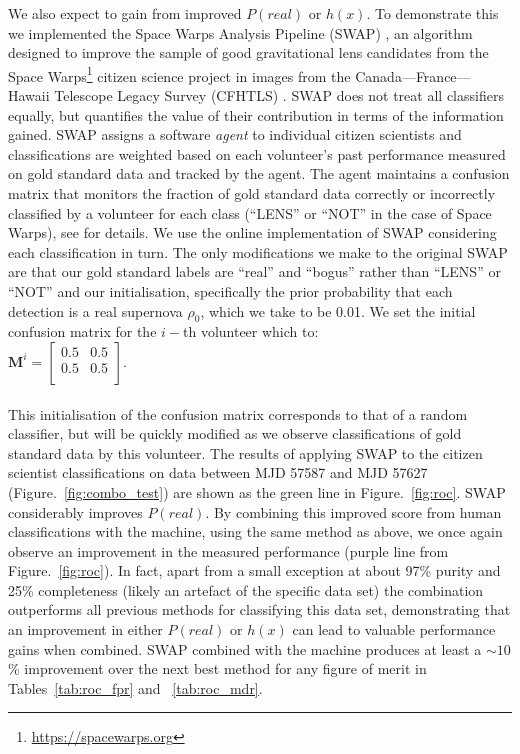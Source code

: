 \message{ !name(blank.tex)}\documentclass[a4paper,fleqn,usenatbib]{mnras}
\begin{document}
We also expect to gain from improved $P(real)$ or $h(x)$.  To demonstrate this we implemented the Space Warps Analysis Pipeline (SWAP) \citep{Marshall16}, an algorithm designed to improve the sample of good gravitational lens candidates from the Space Warps\footnote{\url{https://spacewarps.org}} citizen science project in images from the Canada--–France--–Hawaii Telescope Legacy Survey (CFHTLS) \citep{Gwyn12}.  SWAP does not treat all classifiers equally, but quantifies the value of their contribution in terms of the information gained.  SWAP assigns a software \emph{agent} to individual citizen scientists and classifications are weighted based on each volunteer's past performance measured on gold standard data and tracked by the agent.  The agent maintains a confusion matrix that monitors the fraction of gold standard data correctly or incorrectly classified by a volunteer for each class (``LENS'' or ``NOT'' in the case of Space Warps), see \citet{Marshall16} for details.   We use the online implementation of SWAP considering each classification in turn.  The only modifications we make to the original SWAP are that our gold standard labels are ``real'' and ``bogus'' rather than ``LENS'' or ``NOT'' and our initialisation, specifically the prior probability that each detection is a real supernova $\rho_0$, which we take to be 0.01.  We set the initial confusion matrix for the $i-$th volunteer which to:\\

 $\bm{M}^i = \begin{bmatrix}
                        0.5&0.5\\
                        0.5&0.5 \\
                        \end{bmatrix}$.\\
\\
This initialisation of the confusion matrix corresponds to that of a random classifier, but will be quickly modified as we observe classifications of gold standard data by this volunteer.  The results of applying SWAP to the citizen scientist classifications on data between MJD 57587 and MJD 57627 (Figure.~\ref{fig:combo_test}) are shown as the green line in Figure.~\ref{fig:roc}.  SWAP considerably improves $P(real)$.  By combining this improved score from human classifications with the machine, using the same method as above, we once again observe an improvement in the measured performance (purple line from Figure.~\ref{fig:roc}).  In fact, apart from a small exception at about 97\% purity and 25\% completeness (likely an artefact of the specific data set) the combination outperforms all previous methods for classifying this data set, demonstrating that an improvement in either $P(real)$ or $h(x)$ can lead to valuable performance gains when combined.  SWAP combined with the machine produces at least a $\sim10$\% improvement over the next best method for any figure of merit in Tables~\ref{tab:roc_fpr} and ~\ref{tab:roc_mdr}.
\end{document}
